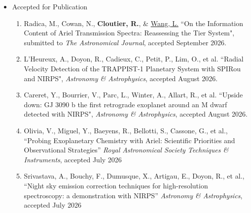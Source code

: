 \documentclass[12pt]{article}
\begin{document}
\begin{itemize}
\begin{enumerate}
\item {\bf Cloutier, R.}, Currie, T., Rieke, G., Kenyon, S. J., Balog, Z., \& Jayawardhana, R. (2014). A Deep Spitzer Survey of Circumstellar Disks in the Young Double Cluster, h \& $\chi$ Persei. {\it The Astrophysical Journal}, 796, 127.
\item Currie, T., {\bf Cloutier, R.}, Debes, J., Kenyon, S., \& Kaisler, D. (2013). ``A Deep Keck/NIRC2 Search for Thermal Emission from Planetary Companions Orbiting Fomalhaut''. {\it The Astrophysical Journal Letters}, 777, 6.
\item {\bf Cloutier, R.}, \& Lin, M. -K. (2013). ``Orbital migration of giant planets induced by gravitationally unstable gaps: the effect of planet mass''. {\it Monthly Notices of the Royal Astronomical Society}, 434, 621-632.

\end{enumerate}

\item Accepted for Publication
\begin{enumerate}
\item Radica, M., Cowan, N., {\bf Cloutier, R.}, \& \underline{Wang, L.} ``On the Information Content of Ariel Transmission Spectra: Reassessing the Tier System", submitted to {\it The Astronomical Journal}, accepted September 2026.
\item L’Heureux, A., Doyon, R., Cadieux, C., Petit, P., Lim, O., et al. ``Radial Velocity Detection of the TRAPPIST-1 Planetary System with SPIRou and NIRPS",  {\it Astronomy \& Astrophysics}, accepted August 2026.
\item Careret, Y., Bourrier, V., Parc, L., Winter, A., Allart, R., et al. ``Upside down: GJ 3090 b the first retrograde exoplanet around an M
dwarf detected with NIRPS", {\it Astronomy \& Astrophysics}, accepted August 2026.
\item Olivia, V., Miguel, Y., Baeyens, R., Bellotti, S., Cassone, G., et al., ``Probing Exoplanetary Chemistry with Ariel: Scientific Priorities and Observational Strategies'' {\it Royal Astronomical Society Techniques \& Instruments}, accepted July 2026
\item Srivastava, A., Bouchy, F., Dumusque, X., Artigau, E., Doyon, R., et al., ``Night sky emission correction techniques for high-resolution spectroscopy: a demonstration with NIRPS'' {\it Astronomy \& Astrophysics}, accepted July 2026
\end{enumerate}


\end{itemize}
\end{document}
